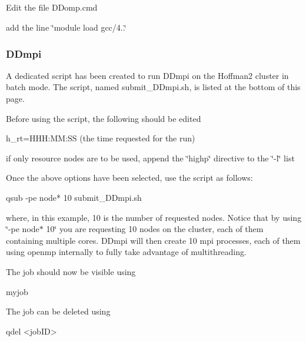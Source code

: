 Edit the file D\+Domp.\+cmd

add the line \char`\"{}module load gcc/4..\char`\"{}

\subparagraph*{}\hypertarget{hoffman2_hoffma2_dd_batch_DDmpi}{}\subsubsection{D\+Dmpi}\label{hoffman2_hoffma2_dd_batch_DDmpi}
A dedicated script has been created to run D\+Dmpi on the Hoffman2 cluster in batch mode. The script, named submit\+\_\+\+D\+Dmpi.\+sh, is listed at the bottom of this page.

Before using the script, the following should be edited
\begin{DoxyItemize}
\item h\+\_\+rt=H\+H\+H\+:\+M\+M\+:S\+S (the time requested for the run)
\item if only resource nodes are to be used, append the \char`\"{}highp\char`\"{} directive to the \char`\"{}-\/l\char`\"{} list
\end{DoxyItemize}

Once the above options have been selected, use the script as follows\+: \begin{DoxyVerb}qsub -pe node* 10 submit_DDmpi.sh
\end{DoxyVerb}
 where, in this example, 10 is the number of requested nodes. Notice that by using \char`\"{}-\/pe node$\ast$ 10\char`\"{} you are requesting 10 nodes on the cluster, each of them containing multiple cores. D\+Dmpi will then create 10 mpi processes, each of them using openmp internally to fully take advantage of multithreading.

The job should now be visible using \begin{DoxyVerb}myjob
\end{DoxyVerb}


The job can be deleted using \begin{DoxyVerb}qdel <jobID>
\end{DoxyVerb}


